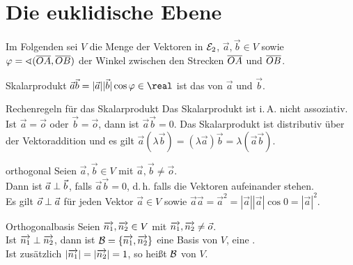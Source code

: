 \section{%
    Die euklidische Ebene%
}

\begin{Bem}
    Im Folgenden sei $V$ die Menge der Vektoren in $\mathcal{E}_2$,
    $\vec{a}, \vec{b} \in V$ sowie
    $\varphi = \sphericalangle(\overline{OA}, \overline{OB})$ der Winkel zwischen
    den Strecken $\overline{OA}$ und $\overline{OB}$.
\end{Bem}

\pagebreak

\begin{Def}{Skalarprodukt}
    $\vec{a} \vec{b} = |\vec{a}| |\vec{b}| \cos \varphi \in \real$
    ist das  von $\vec{a}$ und $\vec{b}$.
\end{Def}

\begin{Satz}{Rechenregeln für das Skalarprodukt}
    Das Skalarprodukt ist i.\,A. nicht assoziativ.
    Ist $\vec{a} = \vec{o}$ oder $\vec{b} = \vec{o}$, dann ist
    $\vec{a} \vec{b} = 0$.
    Das Skalarprodukt ist distributiv über der Vektoraddition und
    es gilt $\vec{a} (\lambda \vec{b}) =
    (\lambda \vec{a}) \vec{b} = \lambda (\vec{a} \vec{b})$.
\end{Satz}

\begin{Def}{orthogonal}
    Seien $\vec{a}, \vec{b} \in V$ mit
    $\vec{a}, \vec{b} \not= \vec{o}$. \\
    Dann ist $\vec{a} \;\bot\; \vec{b}$, falls $\vec{a} \vec{b} = 0$,
    d.\,h. falls die Vektoren  aufeinander stehen. \\
    Es gilt $\vec{o} \;\bot\; \vec{a}$ für jeden Vektor $\vec{a} \in V$
    sowie $\vec{a} \vec{a} = \vec{a}^2 =
    |\vec{a}| |\vec{a}| \cos 0 = |\vec{a}|^2$.
\end{Def}

\begin{Def}{Orthogonalbasis}
    Seien $\overrightarrow{n_1}, \overrightarrow{n_2} \in V$ mit
    $\overrightarrow{n_1}, \overrightarrow{n_2} \not= \vec{o}$. \\
    Ist $\overrightarrow{n_1} \;\bot\; \overrightarrow{n_2}$, dann ist
    $\mathcal{B} = \{\overrightarrow{n_1}, \overrightarrow{n_2}\}$ eine Basis von $V$,
    eine . \\
    Ist zusätzlich $|\overrightarrow{n_1}| = |\overrightarrow{n_2}| = 1$, so heißt
    $\mathcal{B}$  von $V$.
\end{Def}


